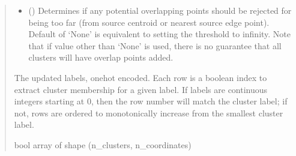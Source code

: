 \documentclass[letterpaper,10pt,english]{sphinxmanual}
\begin{document}
\begin{fulllineitems}
\begin{quote}
\begin{description}
\begin{itemize}
\item {} 
\sphinxAtStartPar
{} (\sphinxstyleliteralemphasis{\sphinxupquote{, }}) \textendash{} Determines if any potential overlapping points should be rejected for
being too far (from source centroid or nearest source edge point).
Default of ‘None’ is equivalent to setting the threshold to infinity.
Note that if value other than ‘None’ is used, there is no guarantee
that all clusters will have overlap points added.

\end{itemize}

\sphinxAtStartPar
{} \textendash{} The updated labels, one\sphinxhyphen{}hot encoded. Each row is a boolean index to
extract cluster membership for a given label. If labels are continuous
integers starting at 0, then the row number will match the cluster
label; if not, rows are ordered to monotonically increase from the
smallest cluster label.

\sphinxAtStartPar
bool array of shape (n\_clusters, n\_coordinates)

\end{description}\end{quote}

\end{fulllineitems}

\end{document}
